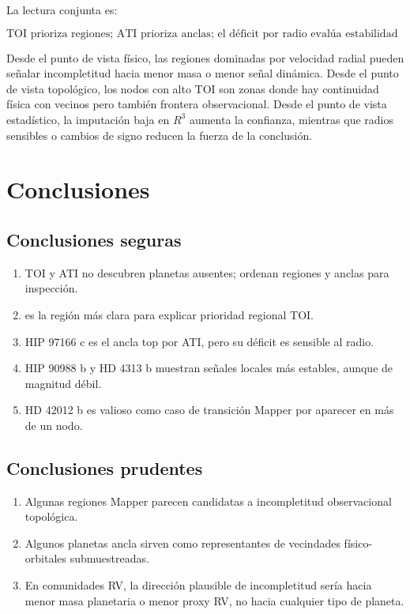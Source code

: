 \documentclass[11pt]{article}
\newcommand{\code}[1]{\texttt{\detokenize{#1}}}
\begin{document}
La lectura conjunta es:

\[
\boxed{\text{TOI prioriza regiones; ATI prioriza anclas; el déficit por radio evalúa estabilidad local.}}
\]

Desde el punto de vista físico, las regiones dominadas por velocidad radial pueden señalar incompletitud hacia menor masa o menor señal dinámica. Desde el punto de vista topológico, los nodos con alto TOI son zonas donde hay continuidad física con vecinos pero también frontera observacional. Desde el punto de vista estadístico, la imputación baja en $R^3$ aumenta la confianza, mientras que radios sensibles o cambios de signo reducen la fuerza de la conclusión.

\section{Conclusiones}

\subsection{Conclusiones seguras}

\begin{enumerate}
    \item TOI y ATI no descubren planetas ausentes; ordenan regiones y anclas para inspección.
    \item \code{cube12_cluster0} es la región más clara para explicar prioridad regional TOI.
    \item HIP 97166 c es el ancla top por ATI, pero su déficit es sensible al radio.
    \item HIP 90988 b y HD 4313 b muestran señales locales más estables, aunque de magnitud débil.
    \item HD 42012 b es valioso como caso de transición Mapper por aparecer en más de un nodo.
\end{enumerate}

\subsection{Conclusiones prudentes}

\begin{enumerate}
    \item Algunas regiones Mapper parecen candidatas a incompletitud observacional topológica.
    \item Algunos planetas ancla sirven como representantes de vecindades físico-orbitales submuestreadas.
    \item En comunidades RV, la dirección plausible de incompletitud sería hacia menor masa planetaria o menor proxy RV, no hacia cualquier tipo de planeta.
\end{enumerate}
\end{document}
